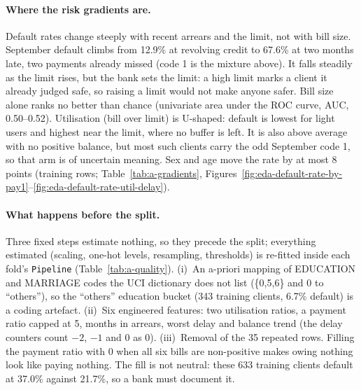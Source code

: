 \paragraph{Where the risk gradients are.}
Default rates change steeply with recent arrears and the limit, not with bill size. September default climbs from 12.9\% at revolving credit to 67.6\% at two months late, two payments already missed (code 1 is the mixture above). It falls steadily as the limit rises, but the bank sets the limit: a high limit marks a client it already judged safe, so raising a limit would not make anyone safer. Bill size alone ranks no better than chance (univariate area under the ROC curve, AUC, 0.50--0.52). Utilisation (bill over limit) is U-shaped: default is lowest for light users and highest near the limit, where no buffer is left. It is also above average with no positive balance, but most such clients carry the odd September code 1, so that arm is of uncertain meaning. Sex and age move the rate by at most 8 points (training rows; Table~\ref{tab:a-gradients}, Figures~\ref{fig:eda-default-rate-by-pay1}--\ref{fig:eda-default-rate-util-delay}).

\paragraph{What happens before the split.}
Three fixed steps estimate nothing, so they precede the split; everything estimated (scaling, one-hot levels, resampling, thresholds) is re-fitted inside each fold's \texttt{Pipeline} (Table~\ref{tab:a-quality}). (i)~An a-priori mapping of EDUCATION and MARRIAGE codes the UCI dictionary does not list (\{0,5,6\} and 0 to ``others''), so the ``others'' education bucket (343 training clients, 6.7\% default) is a coding artefact. (ii)~Six engineered features: two utilisation ratios, a payment ratio capped at 5, months in arrears, worst delay and balance trend (the delay counters count $-2$, $-1$ and 0 as 0). (iii)~Removal of the 35 repeated rows. Filling the payment ratio with 0 when all six bills are non-positive makes owing nothing look like paying nothing. The fill is not neutral: these 633 training clients default at 37.0\% against 21.7\%, so a bank must document it.
